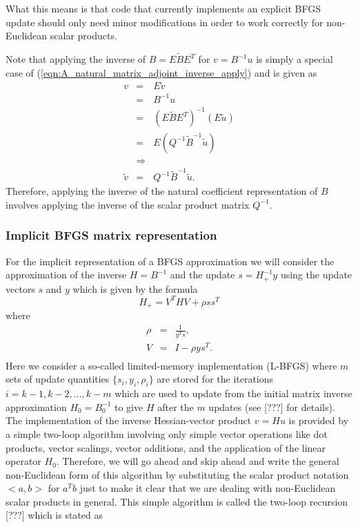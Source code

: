 What this means is that code that currently implements an explicit BFGS update
should only need minor modifications in order to work correctly for
non-Euclidean scalar products.

Note that applying the inverse of $B = E {}\tilde{B} E^T$ for $v = B^{-1} u$
is simply a special case of (\ref{eqn:A_natural_matrix_adjoint_inverse_apply})
and is given as
%
\begin{eqnarray}
v
& = & E \tilde{v} \nonumber \\
& = & B^{-1} u \nonumber \\
& = & (E \tilde{B} E^T)^{-1} (E \tilde{u}) \nonumber \\
& = & E ( Q^{-1} \tilde{B}^{-1} \tilde{u}) \nonumber \\
& \Rightarrow &  \nonumber \\
\tilde{v} & = & Q^{-1} \tilde{B}^{-1} \tilde{u}.
\label{eqn:B_inverse}
\end{eqnarray}
%
Therefore, applying the inverse of the natural coefficient representation of
$B$ involves applying the inverse of the scalar product matrix $Q^{-1}$.

\subsubsection*{Implicit BFGS matrix representation}

For the implicit representation of a BFGS approximation we will consider the
approximation of the inverse $H = B^{-1}$ and the update $s = H_+^{-1} y$
using the update vectors $s$ and $y$ which is given by the formula
%
\begin{equation}
H_+ = V^T H V + \rho s s^T
\end{equation}
%
where
\begin{eqnarray}
\rho & = & \frac{1}{y^T s}, \\
V & = & I - \rho y s^T. \\
\end{eqnarray}
Here we consider a so-called limited-memory implementation (L-BFGS) where $m$
sets of update quantities $\{s_i,y_i,\rho_i\}$ are stored for the iterations
$i = k-1, k-2, {}\ldots, k-m$ which are used to update from the initial matrix
inverse approximation $H_0 = B_0^{-1}$ to give $H$ after the $m$ updates (see
[???] for details).  The implementation of the inverse Hessian-vector product
$v = H u$ is provided by a simple two-loop algorithm involving only simple
vector operations like dot products, vector scalings, vector additions, and
the application of the linear operator $H_0$.  Therefore, we will go ahead and
skip ahead and write the general non-Euclidean form of this algorithm by
substituting the scalar product notation $<a,b>$ for $a^T b$ just to make it
clear that we are dealing with non-Euclidean scalar products in general.  This
simple algorithm is called the two-loop recursion [???] which is stated as

